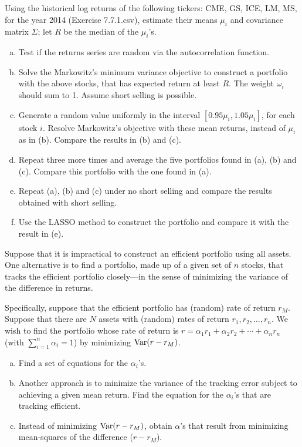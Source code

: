 \prob Using the historical log returns of the following tickers: CME, GS, ICE, LM, MS, for the year 2014 (Exercise 7.7.1.csv), estimate their means $\mu_i$ and covariance matrix $\Sigma$; let $R$ be the median of the $\mu_i$'s. 
	\begin{enumerate}[(a)]
	\item Test if the returns series are random via the autocorrelation function.
	\item Solve the Markowitz's minimum variance objective to construct a portfolio with the above stocks, that has expected return at least $R$. The weight $\omega_i$ should sum to 1. Assume short selling is possible.
	\item Generate a random value uniformly in the interval $[0.95\mu_i,1.05\mu_i]$, for each stock $i$. Resolve Markowitz's objective with these mean returns, instead of $\mu_i$ as in (b). Compare the results in (b) and (c).
	\item Repeat three more times and average the five portfolios found in (a), (b) and (c). Compare this portfolio with the one found in (a).
	\item Repeat (a), (b) and (c) under no short selling and compare the results obtained with short selling.
	\item Use the LASSO method to construct the portfolio and compare it with the result in (e). \twomedskip
	\end{enumerate}
	

\prob Suppose that it is impractical to construct an efficient portfolio using all assets. One alternative is to find a portfolio, made up of a given set of $n$ stocks, that tracks the efficient portfolio closely---in the sense of minimizing the variance of the difference in returns.


Specifically, suppose that the efficient portfolio has (random) rate of return $r_M$. Suppose that there are $N$ assets with (random) rates of return $r_1,r_2,\ldots,r_n$. We wish to find the portfolio whose rate of return is $r=\alpha_1 r_1+ \alpha_2 r_2+ \cdots+ \alpha_n r_n$ (with $\sum_{i=1}^n \alpha_i=1$) by minimizing $\operatorname{Var}(r - r_M)$.
	\begin{enumerate}[(a)]
	\item Find a set of equations for the $\alpha_i$'s.
	\item Another approach is to minimize the variance of the tracking error subject to achieving a given mean return. Find the equation for the $\alpha_i$'s that are tracking efficient.
	\item Instead of minimizing $\operatorname{Var}(r-r_M)$, obtain $\alpha$'s that result from minimizing mean-squares of the difference ($r - r_M$). \twomedskip
	\end{enumerate}


